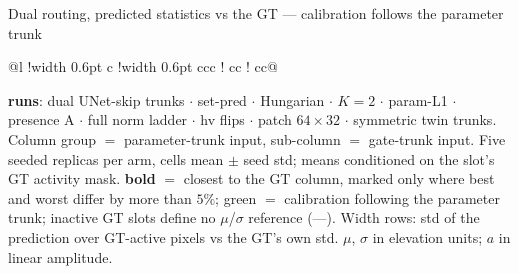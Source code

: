 \begin{frame}{Dual routing, predicted statistics vs the GT --- calibration follows the parameter trunk}
\begin{tabular}{@{}l !{\color{white}\vrule width 0.6pt} c !{\color{white}\vrule width 0.6pt} ccc !{\hspace{7pt}} cc !{\hspace{7pt}} cc@{}}
    \bottomrule
    \end{tabular}
  \par\vspace{3pt}
  \parbox{0.82\textwidth}{\tiny\color{soft} \textbf{runs}: dual UNet-skip trunks $\cdot$ set-pred $\cdot$ Hungarian $\cdot$ $K{=}2$ $\cdot$ param-L1 $\cdot$ presence A $\cdot$ full norm ladder $\cdot$ hv flips $\cdot$ patch $64{\times}32$ $\cdot$ symmetric twin trunks. Column group $=$ parameter-trunk input, sub-column $=$ gate-trunk input. Five seeded replicas per arm, cells mean $\pm$ seed std; means conditioned on the slot's GT activity mask. \textbf{bold} $=$ closest to the \textcolor{good}{GT} column, marked only where best and worst differ by more than $5\%$; \textcolor{good}{green} $=$ calibration following the parameter trunk; inactive GT slots define no $\mu$/$\sigma$ reference (---). Width rows: std of the prediction over GT-active pixels vs the GT's own std. $\mu$, $\sigma$ in elevation units; $a$ in linear amplitude.\par}
    

\end{frame}

